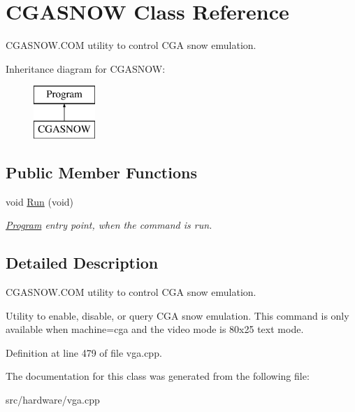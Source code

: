 \hypertarget{classCGASNOW}{\section{C\-G\-A\-S\-N\-O\-W Class Reference}
\label{classCGASNOW}
}


C\-G\-A\-S\-N\-O\-W.\-C\-O\-M utility to control C\-G\-A snow emulation.  


Inheritance diagram for C\-G\-A\-S\-N\-O\-W\-:\begin{figure}[H]
\begin{center}
\leavevmode
\includegraphics[height=2.000000cm]{classCGASNOW}
\end{center}
\end{figure}
\subsection*{Public Member Functions}
\begin{DoxyCompactItemize}
\item 
\hypertarget{classCGASNOW_a756619df2231c00d48df4bfec4a8965b}{void \hyperlink{classCGASNOW_a756619df2231c00d48df4bfec4a8965b}{Run} (void)}\label{classCGASNOW_a756619df2231c00d48df4bfec4a8965b}

\begin{DoxyCompactList}\small\item\em \hyperlink{classProgram}{Program} entry point, when the command is run. \end{DoxyCompactList}\end{DoxyCompactItemize}


\subsection{Detailed Description}
C\-G\-A\-S\-N\-O\-W.\-C\-O\-M utility to control C\-G\-A snow emulation. 

Utility to enable, disable, or query C\-G\-A snow emulation. This command is only available when machine=cga and the video mode is 80x25 text mode. 

Definition at line 479 of file vga.\-cpp.



The documentation for this class was generated from the following file\-:\begin{DoxyCompactItemize}
\item 
src/hardware/vga.\-cpp\end{DoxyCompactItemize}
